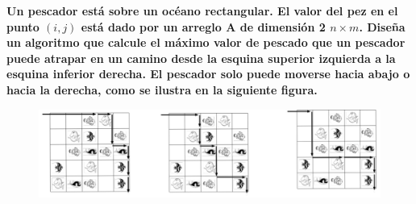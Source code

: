 \textbf{Un pescador est\'a sobre un oc\'eano rectangular. El valor del pez en el punto $(i, j)$ est\'a dado por un arreglo A de dimensi\'on 2 $n \times m$. Dise\~na un algoritmo que calcule el m\'aximo valor de pescado que un pescador puede atrapar en un camino desde la esquina superior izquierda a la esquina inferior derecha. El pescador solo puede moverse hacia abajo o hacia la derecha, como se ilustra en la siguiente figura.}\vspace{.2cm}

\begin{figure}[h!]
    \centering
    \includegraphics[width=0.75\linewidth]{src/Img/lago.PNG}
\end{figure}

\textcolor{bibi}{}
\begin{quote}
\end{quote}